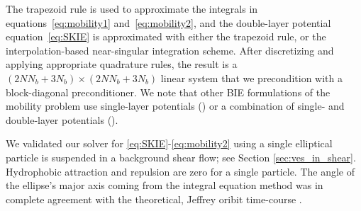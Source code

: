 \documentclass[lineno]{jfm}
\newcommand{\xx}{\mathbf{x}}
\newcommand{\uu}{\mathbf{u}}
\begin{document}
The trapezoid rule is used to approximate the integrals in
equations~\eqref{eq:mobility1} and~\eqref{eq:mobility2}, and the
double-layer potential equation~\eqref{eq:SKIE} is approximated with
either the trapezoid rule, or the interpolation-based near-singular
integration scheme. After discretizing and applying appropriate
quadrature rules, the result is a $(2NN_b + 3N_b) \times (2NN_b + 3N_b)$
linear system that we precondition with a block-diagonal preconditioner.
We note that other BIE formulations of the mobility problem use
single-layer potentials (\cite{cor-gre-rac-vee2017, rac-gre2016}) or a
combination of single- and double-layer potentials (\cite{cor-vee2018}).

We validated our solver for \eqref{eq:SKIE}-\eqref{eq:mobility2} using a single elliptical particle 
is suspended in a background shear flow; see Section \ref{sec:ves_in_shear}.
Hydrophobic attraction and repulsion are zero for a single particle. 
The angle of the ellipse's major axis coming from the integral equation method was in complete agreement 
with the theoretical, Jeffrey oribit time-course \cite{}. 
  
% 

\end{document}
